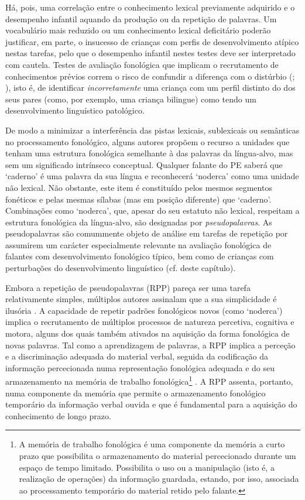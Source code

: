 \documentclass[output=paper,colorlinks,citecolor=brown,booklanguage=portuguese]{langscibook}
\begin{document}
Há, pois, uma correlação entre o conhecimento lexical previamente adquirido e o desempenho infantil aquando da produção ou da repetição de palavras. Um vocabulário mais reduzido ou um conhecimento lexical deficitário poderão justificar, em parte, o insucesso de crianças com perfis de desenvolvimento atípico nestas tarefas, pelo que o desempenho infantil nestes testes deve ser interpretado com cautela. Testes de avaliação fonológica que implicam o recrutamento de conhecimentos prévios correm o risco de confundir a diferença com o distúrbio (\citealp{Campbell1997}; \citealp[159]{CruzSantos2009}), isto é, de identificar \emph{incorretamente} uma criança com um perfil distinto do dos seus pares (como, por exemplo, uma criança bilingue) como tendo um desenvolvimento linguístico patológico.

De modo a minimizar a interferência das pistas lexicais, sublexicais ou semânticas no processamento fonológico, alguns autores propõem o recurso a unidades que tenham uma estrutura fonológica semelhante à das palavras da língua-alvo, mas sem um significado intrínseco conceptual. Qualquer falante do PE saberá que ‘caderno’ é uma palavra da sua língua e reconhecerá ‘noderca’ como uma unidade não lexical. Não obstante, este item é constituído pelos mesmos segmentos fonéticos e pelas mesmas sílabas (mas em posição diferente) que ‘caderno’. Combinações como ‘noderca’, que, apesar do seu estatuto não lexical, respeitam a estrutura fonológica da língua-alvo, são designadas por \emph{pseudopalavras}. As pseudopalavras são comummente objeto de análise em tarefas de repetição por assumirem um carácter especialmente relevante na avaliação fonológica de falantes com desenvolvimento fonológico típico, bem como de crianças com perturbações do desenvolvimento linguístico (cf.  deste capítulo).

Embora a repetição de pseudopalavras (RPP) pareça ser uma tarefa relativamente simples, múltiplos autores assinalam que a sua simplicidade é ilusória \citep{Archibald2008, Coady2008, Gathercole2006}. A capacidade de repetir padrões fonológicos novos (como ‘noderca’) implica o recrutamento de múltiplos processos de natureza percetiva, cognitiva e motora, alguns dos quais também ativados na aquisição da forma fonológica de novas palavras. Tal como a aprendizagem de palavras, a RPP implica a perceção e a discriminação adequada do material verbal, seguida da codificação da informação percecionada numa representação fonológica adequada e do seu armazenamento na memória de trabalho fonológica\footnote{A memória de trabalho fonológica é uma componente da memória a curto prazo que possibilita o armazenamento do material percecionado durante um espaço de tempo limitado. Possibilita o uso ou a manipulação (isto é, a realização de operações) da informação guardada, estando, por isso, associada ao processamento temporário do material retido pelo falante.} \citep{Archibald2008, Coady2008, Gathercole2006, Estes2007, Snowling1991}. A RPP assenta, portanto, numa componente da memória que permite o armazenamento fonológico temporário da informação verbal ouvida e que é fundamental para a aquisição do conhecimento de longo prazo.
\end{document}
